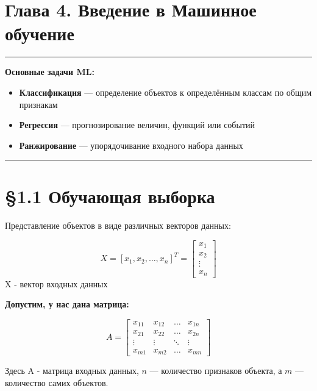 
    \centering
    \vspace{1cm}
\section*{\Huge \textbf{Глава 4. Введение в Машинное обучение}}
\vspace{0.5cm}

    \vspace{1em}
\noindent\rule{\linewidth}{0.4pt}

\vspace{1em}
\textbf{ Основные задачи ML:}
\begin{itemize}
    \item \textbf{Классификация} — определение объектов к определённым классам по общим признакам
    \item \textbf{Регрессия} — прогнозирование величин, функций или событий
    \item \textbf{Ранжирование} — упорядочивание входного набора данных
\end{itemize}

\vspace{1em}
\noindent\rule{\linewidth}{0.4pt}

\section*{\S 1.1 Обучающая выборка}

Представление объектов в виде различных векторов данных:

\[
    X = [x_1, x_2, \ldots, x_n]^T =  \begin{bmatrix}
x_1 \\
x_2 \\
\vdots \\
x_n
\end{bmatrix}
\]
X - вектор входных данных

\textbf{Допустим, у нас дана матрица:}

\[A =
\begin{bmatrix}
x_{11} & x_{12} & \ldots & x_{1n} \\
x_{21} & x_{22} & \ldots & x_{2n} \\
\vdots & \vdots & \ddots & \vdots \\
x_{m1} & x_{m2} & \ldots & x_{mn}
\end{bmatrix}
\]
\raggedright
Здесь A - матрица входных данных, \( n \) — количество признаков объекта, а \( m \) — количество самих объектов.

